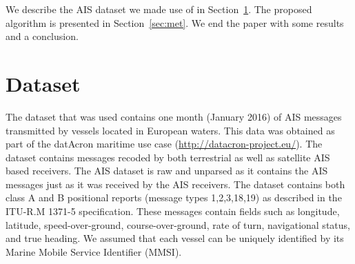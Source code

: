 \documentclass{article}
\begin{document}
 We describe the AIS dataset we made use of in Section~\ref{sec:data}. The proposed algorithm is presented in Section~\ref{sec:met}. We end the paper with some results and a conclusion.

% 
% 
% 
% 
 
\section{Dataset}
\label{sec:data}
The dataset that was used contains one month (January 2016) of AIS messages transmitted by vessels located in European waters. This data was
obtained as part of the datAcron maritime use case (\url{http://datacron-project.eu/}).  
The dataset contains messages recoded by both terrestrial as well as satellite AIS based receivers. The AIS dataset is raw and unparsed as it contains the AIS messages 
just as it was received by the AIS receivers. The dataset contains both class A and B positional reports (message types 1,2,3,18,19)
as described in the ITU-R.M 1371-5 specification. These messages contain fields such as longitude, latitude,
speed-over-ground, course-over-ground, rate of turn, navigational status, and true heading. We assumed that each vessel
can be uniquely identified by its Marine Mobile Service Identifier (MMSI). 
\end{document}
